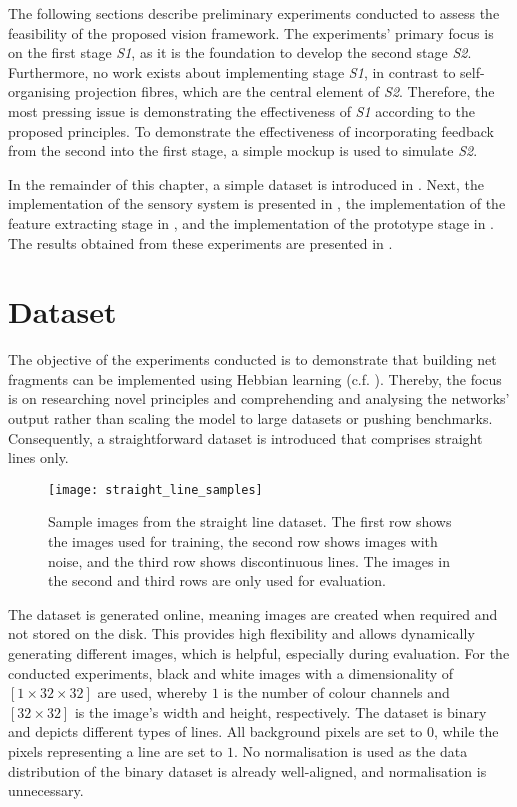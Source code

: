 The following sections describe preliminary experiments conducted to assess the feasibility of the proposed vision framework.
The experiments' primary focus is on the first stage \emph{S1}, as it is the foundation to develop the second stage \emph{S2}. Furthermore, no work exists about implementing stage \emph{S1}, in contrast to self-organising projection fibres, which are the central element of \emph{S2}.
Therefore, the most pressing issue is demonstrating the effectiveness of \emph{S1} according to the proposed principles.
To demonstrate the effectiveness of incorporating feedback from the second into the first stage, a simple mockup is used to simulate \emph{S2}.

In the remainder of this chapter, a simple dataset is introduced in . Next, the implementation of the sensory system is presented in , the implementation of the feature extracting stage in , and the implementation of the prototype stage in . The results obtained from these experiments are presented in .


\section{Dataset}
The objective of the experiments conducted is to demonstrate that building net fragments can be implemented using Hebbian learning  (c.f. ).
Thereby, the focus is on researching novel principles and comprehending and analysing the networks' output rather than scaling the model to large datasets or pushing benchmarks.
Consequently, a straightforward dataset is introduced that comprises straight lines only.


\begin{figure}[h]
    \centering
    \texttt{[image: straight\_line\_samples]}
    \caption[Sample images from the dataset]{Sample images from the straight line dataset. The first row shows the images used for training, the second row shows images with noise, and the third row shows discontinuous lines. The images in the second and third rows are only used for evaluation.}
\end{figure}


The dataset is generated online, meaning images are created when required and not stored on the disk. This provides high flexibility and allows dynamically generating different images, which is helpful, especially during evaluation.
For the conducted experiments, black and white images with a dimensionality of $[1 \times 32 \times 32]$ are used, whereby $1$ is the number of colour channels and $[32 \times 32]$ is the image's width and height, respectively.
The dataset is binary and depicts different types of lines.
All background pixels are set to $0$, while the pixels representing a line are set to $1$.
No normalisation is used as the data distribution of the binary dataset is already well-aligned, and normalisation is unnecessary.

